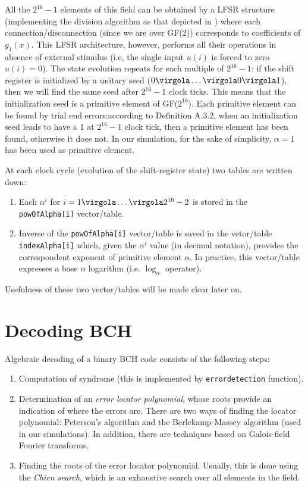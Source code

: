 All the \(2^{16}-1\) elements of this field can be obtained by a LFSR structure (implementing the division algorithm as that depicted in ) where each connection/disconnection (since we are over GF(2)) corresponds to coefficients of \(g_1(x)\). This LFSR architecture, however, performs all their operations in absence of external stimulus (i.e, the single input \(u(i)\) is forced to zero \(u(i) = 0\)).
The state evolution repeats for each multiple of \(2^{16}-1\): if the shift register is initialized by a unitary seed (\(0\virgola \ldots \virgola 0 \virgola 1 \)), then we will find the same seed after \(2^{16}-1\) clock ticks. This means that the initialization seed is a primitive element of GF(\(2^{16}\)).
Each primitive element can be found by trial end errors:according to Definition A.3.2, when an initialization seed leads to have a 1 at \(2^{16}-1\) clock tick, then a primitive element has been found, otherwise it does not. In our simulation, for the sake of simplicity, \(\alpha = 1\) has been used as primitive element.



At each clock cycle (evolution of the shift-register state) two tables are written down: \begin{enumerate}
\item Each \(\alpha^i\) for \(i = 1\virgola \ldots \virgola 2^{16}-2\) is stored in the \texttt{powOfAlpha[i]} vector/table.
\item Inverse of the \texttt{powOfAlpha[i]} vector/table is saved in the vetor/table
\texttt{index\-Al\-pha[i]} which, given the \(\alpha^i\) value (in decimal notation), provides the correspondent exponent of primitive element \(\alpha\). In practice, this vector/table expresses a base \(\alpha\) logarithm (i.e. \(\log_{\alpha}\) operator).
\end{enumerate}
Usefulness of these two vector/tables will be made clear later on.

\section{Decoding BCH}

Algebraic decoding of a binary BCH code consists of the following steps:
\begin{enumerate}
\item Computation of syndrome (this is implemented by \texttt{errordetection} function).
\item Determination of an \emph{error locator polynomial}, whose roots provide an indication of where the errors are. There are two ways of finding the locator polynomial: Peterson's algorithm and the Berlekamp-Massey algorithm (used in our simulations). In addition, there are techniques based on Galois-field Fourier transforms.
\item Finding the roots of the error locator polynomial. Usually, this is done using the \emph{Chien search}, which is an exhaustive search over all elements in the field.
\end{enumerate}

